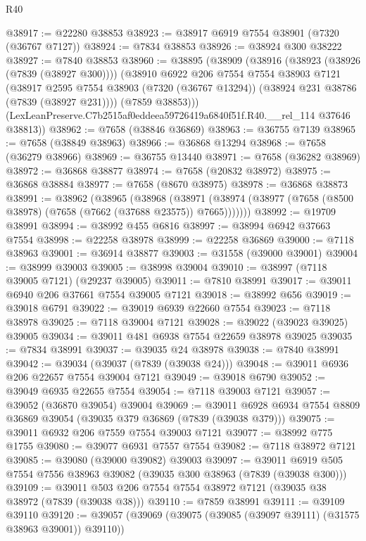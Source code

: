 \begin{lexlean}{R40}
\begin{coremodule}
@38917 := @22280 @38853
@38923 := @38917 @6919 @7554 @38901 (@7320 (@36767 @7127))
@38924 := @7834 @38853
@38926 := @38924 @300 @38222
@38927 := @7840 @38853
@38960 := @38895
    (@38909
      (@38916
        (@38923 (@38926 (@7839 (@38927 @300))))
        (@38910
          @6922
          @206
          @7554
          @7554
          @38903
          @7121
          (@38917
            @2595
            @7554
            @38903
            (@7320 (@36767 @13294))
            (@38924 @231 @38786 (@7839 (@38927 @231))))
          (@7859 @38853)))
      (LexLeanPreserve.C7b2515af0eddeea59726419a6840f51f.R40.__rel_114 @37646 @38813))
@38962 := @7658 (@38846 @36869)
@38963 := @36755 @7139
@38965 := @7658 (@38849 @38963)
@38966 := @36868 @13294
@38968 := @7658 (@36279 @38966)
@38969 := @36755 @13440
@38971 := @7658 (@36282 @38969)
@38972 := @36868 @38877
@38974 := @7658 (@20832 @38972)
@38975 := @36868 @38884
@38977 := @7658 (@8670 @38975)
@38978 := @36868 @38873
@38991 := @38962
    (@38965
      (@38968
        (@38971 (@38974 (@38977 (@7658 (@8500 @38978) (@7658 (@7662 (@37688 @23575)) @7665)))))))
@38992 := @19709 @38991
@38994 := @38992 @455 @6816
@38997 := @38994 @6942 @37663 @7554
@38998 := @22258 @38978
@38999 := @22258 @36869
@39000 := @7118 @38963
@39001 := @36914 @38877
@39003 := @31558 (@39000 @39001)
@39004 := @38999 @39003
@39005 := @38998 @39004
@39010 := @38997 (@7118 @39005 @7121) (@29237 @39005)
@39011 := @7810 @38991
@39017 := @39011 @6940 @206 @37661 @7554 @39005 @7121
@39018 := @38992 @656
@39019 := @39018 @6791
@39022 := @39019 @6939 @22660 @7554
@39023 := @7118 @38978
@39025 := @7118 @39004 @7121
@39028 := @39022 (@39023 @39025) @39005
@39034 := @39011 @481 @6938 @7554 @22659 @38978 @39025
@39035 := @7834 @38991
@39037 := @39035 @24 @38978
@39038 := @7840 @38991
@39042 := @39034 (@39037 (@7839 (@39038 @24)))
@39048 := @39011 @6936 @206 @22657 @7554 @39004 @7121
@39049 := @39018 @6790
@39052 := @39049 @6935 @22655 @7554
@39054 := @7118 @39003 @7121
@39057 := @39052 (@36870 @39054) @39004
@39069 := @39011 @6928 @6934 @7554 @8809 @36869 @39054 (@39035 @379 @36869 (@7839 (@39038 @379)))
@39075 := @39011 @6932 @206 @7559 @7554 @39003 @7121
@39077 := @38992 @775 @1755
@39080 := @39077 @6931 @7557 @7554
@39082 := @7118 @38972 @7121
@39085 := @39080 (@39000 @39082) @39003
@39097 := @39011 @6919 @505 @7554 @7556 @38963 @39082 (@39035 @300 @38963 (@7839 (@39038 @300)))
@39109 := @39011 @503 @206 @7554 @7554 @38972 @7121 (@39035 @38 @38972 (@7839 (@39038 @38)))
@39110 := @7859 @38991
@39111 := @39109 @39110
@39120 := @39057 (@39069 (@39075 (@39085 (@39097 @39111) (@31575 @38963 @39001)) @39110))

\end{coremodule}
\end{lexlean}

